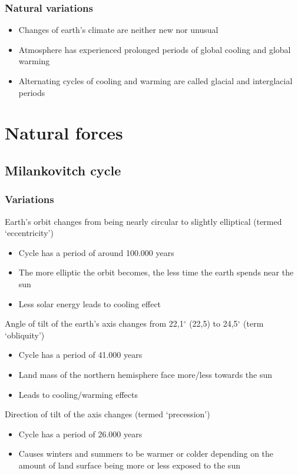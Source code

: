 \documentclass{article}
\begin{document}
\subsubsection{Natural variations}
\begin{itemize}
    \item Changes of earth’s climate are neither new nor unusual
    \item Atmosphere has experienced prolonged periods of global cooling and global warming
    \item Alternating cycles of cooling and warming are called glacial and interglacial periods
\end{itemize}

\section{Natural forces}
\subsection{Milankovitch cycle}
\subsubsection{Variations}
Earth’s orbit changes from being nearly circular to slightly elliptical (termed ‘eccentricity’)
\begin{itemize}[label=$\to$]
    \item Cycle has a period of around 100.000 years
    \item The more elliptic the orbit becomes, the less time the earth spends near the sun
    \item Less solar energy leads to cooling effect
\end{itemize}

Angle of tilt of the earth’s axis changes from 22,1$^\circ$ (22,5) to 24,5$^\circ$ (term ‘obliquity’)
\begin{itemize}[label=$\to$]
    \item Cycle has a period of 41.000 years
    \item Land mass of the northern hemisphere face more/less towards the sun
    \item Leads to cooling/warming effects
\end{itemize}

Direction of tilt of the axis changes (termed ‘precession’)
\begin{itemize}[label=$\to$]
    \item Cycle has a period of 26.000 years
    \item Causes winters and summers to be warmer or colder depending on the amount of land surface being more or less exposed to the sun
\end{itemize}
\end{document}
